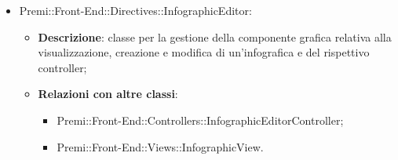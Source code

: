 \begin{itemize}
    \item Premi::Front-End::Directives::InfographicEditor:
	\begin{itemize}
		\item \textbf{Descrizione}: classe per la gestione della componente grafica relativa alla visualizzazione, creazione e modifica di un'\gls{infografica} e del rispettivo controller;
		\item \textbf{Relazioni con altre classi}:
		\begin{itemize}
			\item Premi::Front-End::Controllers::InfographicEditorController;
			\item Premi::Front-End::Views::InfographicView.
		\end{itemize}
	\end{itemize}

\end{itemize}
